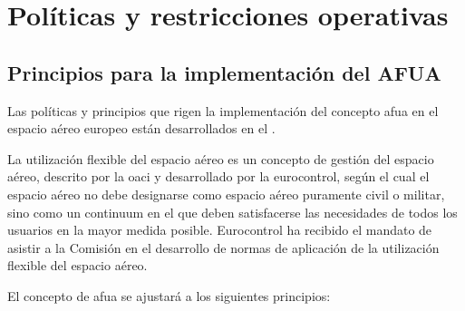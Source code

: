 \section{Políticas y restricciones operativas}

\subsection{Principios para la implementación del AFUA}

Las políticas y principios que rigen la implementación del concepto \acrfull{afua} en el espacio aéreo europeo están desarrollados en el  \cite{CE2150/2005}. 

La utilización flexible del espacio aéreo es un concepto de gestión del espacio aéreo, descrito por la \acrfull{oaci} y desarrollado por la \acrfull{eurocontrol}, según el cual el espacio aéreo no debe designarse como espacio aéreo puramente civil o militar, sino como un continuum en el que deben satisfacerse las necesidades de todos los usuarios en la mayor medida posible.  Eurocontrol ha recibido el mandato de asistir a la Comisión en el desarrollo de normas de aplicación de la utilización flexible del espacio aéreo. 

El concepto de \acrfull{afua} se ajustará a los siguientes principios:

